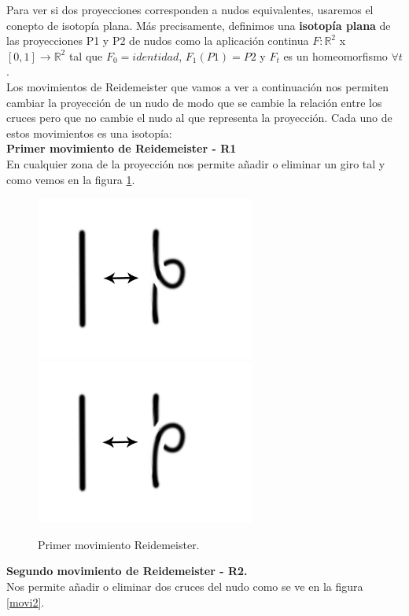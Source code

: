 \documentclass[14pt]{extarticle}
\begin{document}
Para ver si dos proyecciones corresponden a nudos equivalentes, usaremos el conepto de isotopía plana. Más precisamente, definimos una \textbf{isotopía plana} de las proyecciones P1 y P2 de nudos como la aplicación continua $F: \mathds{R}^{2}$ x $[0,1] \rightarrow \mathds{R}^{2}$ tal que $F_{0}=identidad$, $F_{1}(P1) = P2$ y $F_{t}$ es un homeomorfismo $\forall t$.\\

Los movimientos de Reidemeister que vamos a ver a continuación nos permiten cambiar la proyección de un nudo de modo que se cambie la relación entre los cruces pero que no cambie el nudo al que representa la proyección. Cada uno de estos movimientos es una isotopía:\\

	\textbf{Primer movimiento de Reidemeister - R1}\\
En cualquier zona de la proyección nos permite añadir o eliminar un giro tal y como vemos en la figura \ref{movi1}.\\

  \begin{figure}[h!]
  	\includegraphics[width=7.2cm]{inudos/movi1.png}
  	\includegraphics[width=7.2cm]{inudos/movi2.png}
  	\centering
  	\caption{Primer movimiento Reidemeister.}
  	\label{movi1} 
  \end{figure}
  
	\textbf{Segundo movimiento de Reidemeister - R2.}\\
Nos permite añadir o eliminar dos cruces del nudo como se ve en la figura \ref{movi2}.\\
\end{document}
